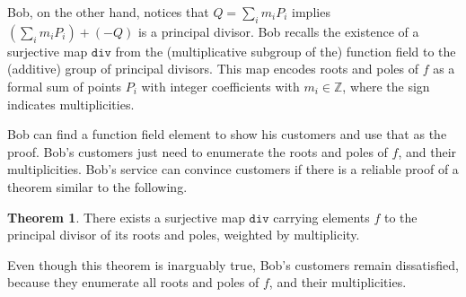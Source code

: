 \documentclass{article}
\theoremstyle{definition}
\newtheorem{theorem}{Theorem}
\newcommand{\6}{\mathbf}
\newcommand{\7}{\mathcal}
\begin{document}
Bob, on the other hand, notices that $Q = \sum_i m_i P_i$ implies $(\sum_i m_i P_i) + (-Q)$ is a principal divisor. Bob recalls the existence of a surjective map $\texttt{div}$ from the (multiplicative subgroup of the)  function field to the (additive) group of principal divisors.  This map encodes roots and poles of $f$ as a formal sum of points  $P_i$ with integer coefficients with $m_i \in \mathbb{Z}$, where the sign indicates multiplicities. 

Bob can find a function field element to show his customers and use that as the proof. Bob's customers just need to enumerate the roots and poles of $f$, and their multiplicities.
Bob's service can convince customers if there is a reliable proof of a theorem similar to the following. 
\begin{theorem}
There exists a surjective map $\texttt{div}$ carrying elements $f$ to the principal divisor of its roots and poles, weighted by multiplicity.
\end{theorem}

Even though this theorem is inarguably true, Bob's customers remain dissatisfied, because they enumerate all roots and poles of $f$, and their multiplicities.


\end{document}

